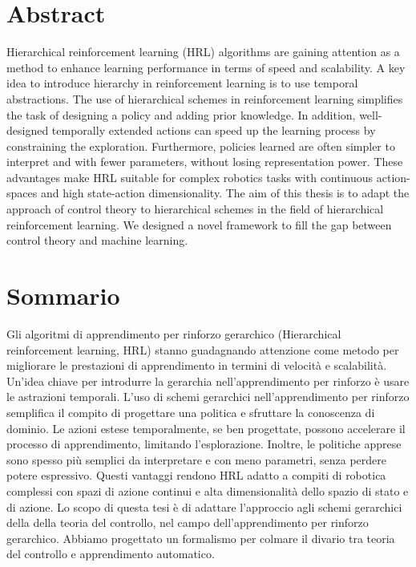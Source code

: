\newpage
\chapter*{Abstract}

Hierarchical reinforcement learning (HRL) algorithms are gaining attention as a method to enhance learning performance in terms of speed and scalability. A key idea to introduce hierarchy in reinforcement learning is to use temporal abstractions. The use of hierarchical schemes in reinforcement learning simplifies the task of designing a policy and adding prior knowledge. In addition, well-designed temporally extended actions can speed up the learning process by constraining the exploration. Furthermore, policies learned are often simpler to interpret and with fewer parameters, without losing representation power. These advantages make HRL suitable for complex robotics tasks with continuous action-spaces and high state-action dimensionality. The aim of this thesis is to adapt the approach of control theory to hierarchical schemes in the field of hierarchical reinforcement learning. We designed a novel framework to fill the gap between control theory and machine learning. 


\newpage
\chapter*{Sommario}

Gli algoritmi di apprendimento per rinforzo gerarchico (Hierarchical reinforcement learning, HRL) stanno guadagnando attenzione come metodo per migliorare le prestazioni di apprendimento in termini di velocità e scalabilità. Un'idea chiave per introdurre la gerarchia nell'apprendimento per rinforzo è usare le astrazioni temporali. L'uso di schemi gerarchici nell'apprendimento per rinforzo semplifica il compito di progettare una politica e sfruttare la conoscenza di dominio. Le azioni estese temporalmente, se ben progettate, possono accelerare il processo di apprendimento, limitando l'esplorazione. Inoltre, le politiche apprese sono spesso più semplici da interpretare e con meno parametri, senza perdere potere espressivo. Questi vantaggi rendono HRL adatto a compiti di robotica complessi con spazi di azione continui e alta dimensionalità dello spazio di stato e di azione. Lo scopo di questa tesi è di adattare l'approccio agli schemi gerarchici della della teoria del controllo, nel campo dell'apprendimento per rinforzo gerarchico. Abbiamo progettato un formalismo per colmare il divario tra teoria del controllo e apprendimento automatico.